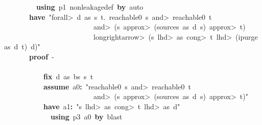\documentclass{article}
\newcommand{\syntaxKEYWORDA}[1]{\textcolor[rgb]{0.0,0.4,0.6}{\textbf{#1}}}
\newcommand{\syntaxKEYWORDC}[1]{\textcolor[rgb]{0.0,0.6,1.0}{\textbf{#1}}}
\newcommand{\syntaxLITERALA}[1]{\textcolor[rgb]{1.0,0.0,0.8}{#1}}
\newcommand{\syntaxOPERATOR}[1]{\textcolor[rgb]{0.0,0.0,0.0}{\textbf{#1}}}
\newcommand{\syntaxKEYWORDA}[1]{\textcolor[rgb]{0.0,0.4,0.6}{\textbf{#1}}}
\newcommand{\syntaxKEYWORDC}[1]{\textcolor[rgb]{0.0,0.6,1.0}{\textbf{#1}}}
\newcommand{\syntaxLITERALA}[1]{\textcolor[rgb]{1.0,0.0,0.8}{#1}}
\newcommand{\syntaxOPERATOR}[1]{\textcolor[rgb]{0.0,0.0,0.0}{\textbf{#1}}}
\newcommand{\syntaxKEYWORDA}[1]{\textcolor[rgb]{0.0,0.4,0.6}{\textbf{#1}}}
\newcommand{\syntaxKEYWORDC}[1]{\textcolor[rgb]{0.0,0.6,1.0}{\textbf{#1}}}
\newcommand{\syntaxLITERALA}[1]{\textcolor[rgb]{1.0,0.0,0.8}{#1}}
\newcommand{\syntaxOPERATOR}[1]{\textcolor[rgb]{0.0,0.0,0.0}{\textbf{#1}}}
\newcommand{\syntaxKEYWORDA}[1]{\textcolor[rgb]{0.0,0.4,0.6}{#1}}
\newcommand{\syntaxKEYWORDC}[1]{\textcolor[rgb]{0.0,0.6,1.0}{#1}}
\newcommand{\syntaxLITERALA}[1]{\textcolor[rgb]{1.0,0.0,0.8}{\textbf{#1}}}
\newcommand{\syntaxOPERATOR}[1]{\textcolor[rgb]{0.0,0.0,0.0}{#1}}
\newcommand{\syntaxKEYWORDA}[1]{\textcolor[rgb]{0.0,0.4,0.6}{\textbf{#1}}}
\newcommand{\syntaxKEYWORDC}[1]{\textcolor[rgb]{0.0,0.6,1.0}{\textbf{#1}}}
\newcommand{\syntaxLITERALA}[1]{\textcolor[rgb]{1.0,0.0,0.8}{#1}}
\newcommand{\syntaxOPERATOR}[1]{\textcolor[rgb]{0.0,0.0,0.0}{\textbf{#1}}}
\newcommand{\syntaxKEYWORDA}[1]{\textcolor[rgb]{0.0,0.4,0.6}{\textbf{#1}}}
\newcommand{\syntaxKEYWORDC}[1]{\textcolor[rgb]{0.0,0.6,1.0}{\textbf{#1}}}
\newcommand{\syntaxLITERALA}[1]{\textcolor[rgb]{1.0,0.0,0.8}{#1}}
\newcommand{\syntaxOPERATOR}[1]{\textcolor[rgb]{0.0,0.0,0.0}{\textbf{#1}}}
\begin{document}
{\ }{\ }{\ }{\ }{\ }{\ }{\ }{\ }{\ }{\ }\syntaxKEYWORDA{using}{\ }p1{\ }nonleakage\usebox{\underscorebox}def{\ }\syntaxKEYWORDA{by}{\ }auto\hspace*{\fill}\\
{\ }{\ }{\ }{\ }{\ }{\ }{\ }{\ }\syntaxKEYWORDA{have}{\ }\syntaxLITERALA{"\<forall>{\ }d{\ }as{\ }s{\ }t.{\ }reachable0{\ }s{\ }\<and>{\ }reachable0{\ }t}\hspace*{\fill}\\
\syntaxLITERALA{{\ }{\ }{\ }{\ }{\ }{\ }{\ }{\ }{\ }{\ }{\ }{\ }{\ }{\ }{\ }{\ }{\ }{\ }{\ }{\ }{\ }{\ }{\ }{\ }{\ }{\ }\<and>{\ }(s{\ }\<approx>{\ }(sources{\ }as{\ }d{\ }s){\ }\<approx>{\ }t)}\hspace*{\fill}\\
\syntaxLITERALA{{\ }{\ }{\ }{\ }{\ }{\ }{\ }{\ }{\ }{\ }{\ }{\ }{\ }{\ }{\ }{\ }{\ }{\ }{\ }{\ }{\ }{\ }{\ }{\ }{\ }{\ }\<longrightarrow>{\ }(s{\ }\<lhd>{\ }as{\ }\<cong>{\ }t{\ }\<lhd>{\ }(ipurge{\ }as{\ }d{\ }t){\ }\usebox{\atbox}{\ }d)"}\hspace*{\fill}\\
{\ }{\ }{\ }{\ }{\ }{\ }{\ }{\ }\syntaxKEYWORDA{proof}{\ }{-}\hspace*{\fill}\\
{\ }{\ }{\ }{\ }{\ }{\ }{\ }{\ }{\ }{\ }\syntaxKEYWORDA{\usebox{\opencurlybracket}}\hspace*{\fill}\\
{\ }{\ }{\ }{\ }{\ }{\ }{\ }{\ }{\ }{\ }{\ }{\ }\syntaxKEYWORDC{fix}{\ }d{\ }as{\ }bs{\ }s{\ }t\hspace*{\fill}\\
{\ }{\ }{\ }{\ }{\ }{\ }{\ }{\ }{\ }{\ }{\ }{\ }\syntaxKEYWORDC{assume}{\ }a0\syntaxOPERATOR{:}{\ }\syntaxLITERALA{"reachable0{\ }s{\ }\<and>{\ }reachable0{\ }t}\hspace*{\fill}\\
\syntaxLITERALA{{\ }{\ }{\ }{\ }{\ }{\ }{\ }{\ }{\ }{\ }{\ }{\ }{\ }{\ }{\ }{\ }{\ }{\ }{\ }{\ }{\ }{\ }{\ }{\ }{\ }{\ }\<and>{\ }(s{\ }\<approx>{\ }(sources{\ }as{\ }d{\ }s){\ }\<approx>{\ }t)"}\hspace*{\fill}\\
{\ }{\ }{\ }{\ }{\ }{\ }{\ }{\ }{\ }{\ }{\ }{\ }\syntaxKEYWORDA{have}{\ }a1\syntaxOPERATOR{:}{\ }\syntaxLITERALA{"s{\ }\<lhd>{\ }as{\ }\<cong>{\ }t{\ }\<lhd>{\ }as{\ }\usebox{\atbox}{\ }d"}\hspace*{\fill}\\
{\ }{\ }{\ }{\ }{\ }{\ }{\ }{\ }{\ }{\ }{\ }{\ }{\ }{\ }\syntaxKEYWORDA{using}{\ }p3{\ }a0{\ }\syntaxKEYWORDA{by}{\ }blast\hspace*{\fill}\\
\end{document}
